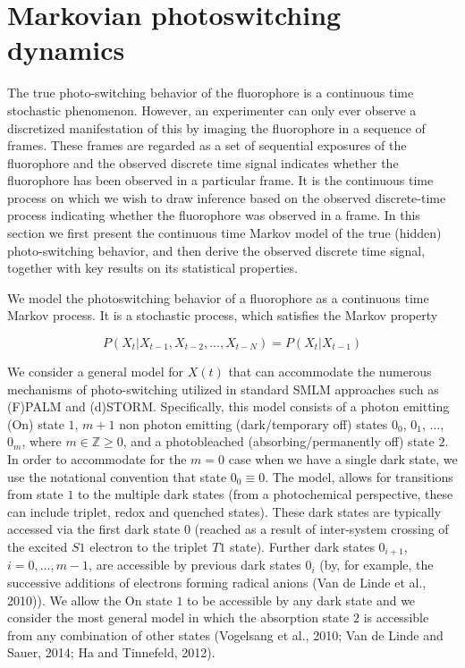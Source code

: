 \documentclass{ucetd}
\begin{document}
\section{Markovian photoswitching dynamics}

The true photo-switching behavior of the fluorophore is a continuous time stochastic phenomenon. However, an experimenter can only ever observe a discretized manifestation of this
by imaging the fluorophore in a sequence of frames. These frames are regarded as a set of
sequential exposures of the fluorophore and the observed discrete time signal indicates whether
the fluorophore has been observed in a particular frame. It is the continuous time process on
which we wish to draw inference based on the observed discrete-time process indicating whether
the fluorophore was observed in a frame. In this section we first present the continuous time
Markov model of the true (hidden) photo-switching behavior, and then derive the observed
discrete time signal, together with key results on its statistical properties.


We model the photoswitching behavior of a fluorophore as a continuous time Markov process. It is a stochastic process, which satisfies the Markov property

\begin{equation*}
P(X_{t}|X_{t-1}, X_{t-2}, ..., X_{t-N}) = P(X_{t}|X_{t-1})
\end{equation*}

We consider a general model for $X(t)$ that can accommodate the numerous mechanisms of photo-switching utilized in standard SMLM approaches such as (F)PALM and (d)STORM. Specifically, this model consists of a photon emitting (On) state $1$, $m+1$ non photon emitting (dark/temporary off) states $0_0$, $0_1$, $\ldots$, $0_m$, where $m \in \mathbb{Z}{\geq 0}$, and a photobleached (absorbing/permanently off) state $2$. In order to accommodate for the $m = 0$ case when we have a single dark state, we use the notational convention that state $0_0 \equiv 0$. The model, allows for transitions from state $1$ to the multiple dark states (from a photochemical perspective, these can include triplet, redox and quenched states). These dark states are typically accessed via the first dark state $0$ (reached as a result of inter-system crossing of the excited $S1$ electron to the triplet $T1$ state). Further dark states $0_{i+1}$, $i = 0, \ldots, m-1$, are accessible by previous dark states $0_i$ (by, for example, the successive additions of electrons forming radical anions (Van de Linde et al., 2010)). We allow the On state $1$ to be accessible by any dark state and we consider the most general model in which the absorption state $2$ is accessible from any combination of other states (Vogelsang et al., 2010; Van de Linde and Sauer, 2014; Ha and Tinnefeld, 2012).
\end{document}
